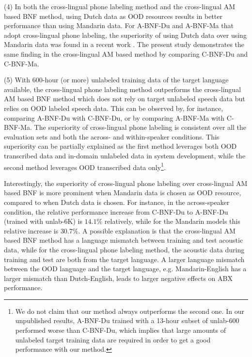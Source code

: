 \documentclass[transmag]{IEEEtran}
\begin{document}
(4) In both the cross-lingual phone labeling method and the cross-lingual AM based BNF method, using Dutch data as OOD resources results in better performance than using Mandarin data. For A-BNF-Du and A-BNF-Ma that adopt cross-lingual phone labeling, the superiority of using Dutch data over using Mandarin data was found in a recent work \cite{feng2020unsupervised}. The present study demonstrates the same finding  in the cross-lingual AM based method by comparing  C-BNF-Du and C-BNF-Ma.

(5) With $600$-hour (or more) unlabeled training data of the target language available, the cross-lingual phone labeling method outperforms the cross-lingual AM based BNF method which does not rely on target unlabeled speech data but relies on OOD labeled speech data.  This can be observed by, for instance, comparing A-BNF-Du with C-BNF-Du, or by comparing A-BNF-Ma with C-BNF-Ma. The superiority of cross-lingual phone labeling is consistent over all the evaluation sets and both the across- and within-speaker conditions. This superiority can be partially explained as the first method leverages both OOD transcribed data and in-domain unlabeled data in system development, while the second method leverages OOD transcribed data only\footnote{We do not claim that   our method always outperforms the second one. In our unpublished results, A-BNF-Du trained with a 13-hour subset of unlab-600 performed worse than C-BNF-Du, which implies that large amounts of unlabeled target training data are required in order to get a good performance with our method.}.

Interestingly, the superiority of cross-lingual phone labeling over cross-lingual AM based BNF is more prominent when Mandarin data is chosen as OOD resource, compared to when Dutch data is chosen. For instance, in the across-speaker condition, the relative performance increase from C-BNF-Du to A-BNF-Du (trained with unlab-6K) is 
$14.1\%$ relatively,
while for the Mandarin models this relative increase is 
$30.7\%$.
A possible explanation is that the cross-lingual AM based BNF method has a language mismatch   between training  and test acoustic data,
while for the cross-lingual phone labeling method, the acoustic data during training and test are both from the target language. A larger language mismatch between the OOD language and the target language, e.g. Mandarin-English has a larger mismatch than Dutch-English, leads to larger negative effects on ABX performance.
\end{document}
